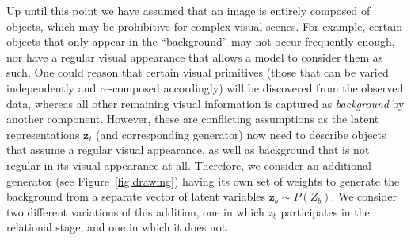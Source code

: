 \documentclass{article}
\begin{document}

Up until this point we have assumed that an image is entirely composed of objects, which may be prohibitive for complex visual scenes. 
For example, certain objects that only appear in the ``background'' may not occur frequently enough, nor have a regular visual appearance that allows a model to consider them as such.
One could reason that certain visual primitives (those that can be varied independently and re-composed accordingly) will be discovered from the observed data, whereas all other remaining visual information is captured as \emph{background} by another component. 
However, these are conflicting assumptions as the latent representations $\bm{z}_i$ (and corresponding generator) now need to describe objects that assume a regular visual appearance, as well as background that is not regular in its visual appearance at all.
Therefore, we consider an additional generator (see Figure~\ref{fig:drawing}) having its own set of weights to generate the background from a separate vector of latent variables $\bm{z}_b \sim P(Z_b)$.
We consider two different variations of this addition, one in which $z_b$ participates in the relational stage, and one in which it does not.
\end{document}
